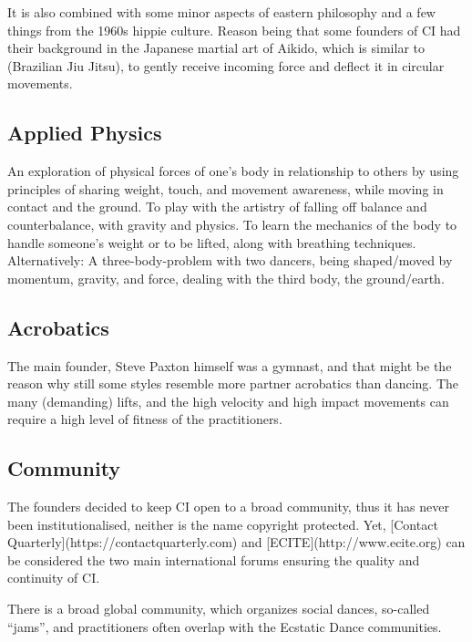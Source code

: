 It is also combined with some minor aspects of eastern philosophy and a few things from the 1960s hippie culture.
Reason being that some founders of CI had their background in the Japanese martial art of Aikido, which is similar to (Brazilian Jiu Jitsu), to gently receive incoming force and deflect it in circular movements.

\subsection{Applied Physics}\label{subsec:applied-physics}

An exploration of physical forces of one's body in relationship to others by using principles of sharing weight, touch, and movement awareness, while moving in contact and the ground.
To play with the artistry of falling off balance and counterbalance, with gravity and physics.
To learn the mechanics of the body to handle someone's weight or to be lifted, along with breathing techniques.
Alternatively: A three-body-problem with two dancers, being shaped/moved by momentum, gravity, and force, dealing with the third body, the ground/earth.

\subsection{Acrobatics}\label{subsec:acrobatics}

The main founder, Steve Paxton himself was a gymnast, and that might be the reason why still some styles resemble more partner acrobatics than dancing.
The many (demanding) lifts, and the high velocity and high impact movements can require a high level of fitness of the practitioners.

\subsection{Community}\label{subsec:community}

The founders decided to keep CI open to a broad community, thus it has never been institutionalised, neither is the name copyright protected.
Yet, [Contact Quarterly](https://contactquarterly.com) and [ECITE](http://www.ecite.org) can be considered the two main international forums ensuring the quality and continuity of CI.

There is a broad global community, which organizes social dances, so-called ``jams'', and practitioners often overlap with the Ecstatic Dance communities.

